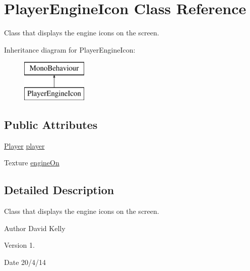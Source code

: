 \hypertarget{class_player_engine_icon}{\section{Player\-Engine\-Icon Class Reference}
\label{class_player_engine_icon}
}


Class that displays the engine icons on the screen.  


Inheritance diagram for Player\-Engine\-Icon\-:\begin{figure}[H]
\begin{center}
\leavevmode
\includegraphics[height=2.000000cm]{class_player_engine_icon}
\end{center}
\end{figure}
\subsection*{Public Attributes}
\begin{DoxyCompactItemize}
\item 
\hyperlink{class_player}{Player} \hyperlink{class_player_engine_icon_aa4786c7c7622809d7361e6a35dfac6c5}{player}
\item 
Texture \hyperlink{class_player_engine_icon_aa98ba90a581a22a8a13527076251325c}{engine\-On}
\end{DoxyCompactItemize}


\subsection{Detailed Description}
Class that displays the engine icons on the screen. 

\begin{DoxyAuthor}{Author}
David Kelly 
\end{DoxyAuthor}
\begin{DoxyVersion}{Version}
1. 
\end{DoxyVersion}
\begin{DoxyDate}{Date}
20/4/14 
\end{DoxyDate}



